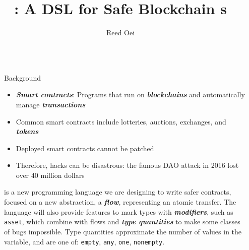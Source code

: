 \documentclass[usenames, dvipsnames, final]{beamer}
\title{\langName: A DSL for Safe Blockchain \AssetTxt{}s}
\author{Reed Oei} %
\institute[shortinst]{University of Illinois} %
\newlength{\sepwidth}
\newlength{\colwidth}
\newcommand{\separatorcolumn}{\begin{column}{\sepwidth}\end{column}}
\newcommand{\term}[1]{\textbf{\emph{#1}}}
\begin{document}
\begin{frame}[t]
\begin{columns}[t]
\separatorcolumn

\begin{column}{\colwidth}
    \begin{block}{Background}
        \begin{itemize}
            \item \term{Smart contracts}: Programs that run on \term{blockchains} and automatically manage \term{transactions}
            \item Common smart contracts include lotteries, auctions, exchanges, and \term{tokens}~\cite{OlivaEtAl2019}
            \item Deployed smart contracts cannot be patched
            \item Therefore, hacks can be disastrous: the famous DAO attack in 2016 lost over 40 million dollars~\cite{DAO}
        \end{itemize}

        \textcolor{softRed}{\textbf{\langName}} is a new programming language we are designing to write safer contracts, focused on a new abstraction, a \term{flow}, representing an atomic transfer.
        The \langName language will also provide features to mark types with \term{modifiers}, such as \lstinline[language=flow,basicstyle=\normalsize\ttfamily]{asset}, which combine with flows and \term{type quantities} to make some classes of bugs impossible.
        Type quantities approximate the number of values in the variable, and are one of: \lstinline[language=flow,basicstyle=\normalsize\ttfamily]{empty}, \lstinline[language=flow,basicstyle=\normalsize\ttfamily]{any}, \lstinline[language=flow,basicstyle=\normalsize\ttfamily]{one}, \lstinline[language=flow,basicstyle=\normalsize\ttfamily]{nonempty}.
    \end{block}


\end{column}
\end{columns}
\end{frame}
\end{document}
